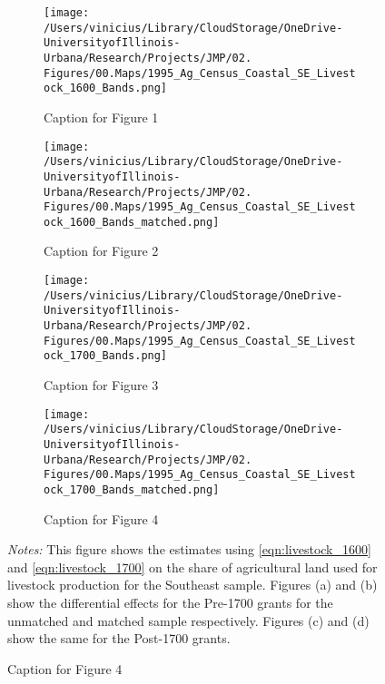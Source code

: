 \documentclass[11pt]{article}
\begin{document}
\clearpage

\begin{landscape}
  \begin{figure}[htbp]
    \caption{Effects of Coastal Ban on Livestock with Varying Cutoffs on Livestock Area - Southeast Sample}
    \centering
    \begin{subfigure}[b]{0.65\textwidth}
        \centering
        \texttt{[image: /Users/vinicius/Library/CloudStorage/OneDrive-UniversityofIllinois-Urbana/Research/Projects/JMP/02. Figures/00.Maps/1995\_Ag\_Census\_Coastal\_SE\_Livestock\_1600\_Bands.png]}
        \caption{Caption for Figure 1}
        \label{fig:fig1}
    \end{subfigure}
    \hfill
    \begin{subfigure}[b]{0.65\textwidth}
        \centering
        \texttt{[image: /Users/vinicius/Library/CloudStorage/OneDrive-UniversityofIllinois-Urbana/Research/Projects/JMP/02. Figures/00.Maps/1995\_Ag\_Census\_Coastal\_SE\_Livestock\_1600\_Bands\_matched.png]}
        \caption{Caption for Figure 2}
        \label{fig:fig2}
    \end{subfigure}

    \vspace{0.1cm} %

    \begin{subfigure}[b]{0.65\textwidth}
        \centering
        \texttt{[image: /Users/vinicius/Library/CloudStorage/OneDrive-UniversityofIllinois-Urbana/Research/Projects/JMP/02. Figures/00.Maps/1995\_Ag\_Census\_Coastal\_SE\_Livestock\_1700\_Bands.png]}
        \caption{Caption for Figure 3}
        \label{fig:fig3}
    \end{subfigure}
    \hfill
    \begin{subfigure}[b]{0.65\textwidth}
        \centering
        \texttt{[image: /Users/vinicius/Library/CloudStorage/OneDrive-UniversityofIllinois-Urbana/Research/Projects/JMP/02. Figures/00.Maps/1995\_Ag\_Census\_Coastal\_SE\_Livestock\_1700\_Bands\_matched.png]}
        \caption{Caption for Figure 4}
        \label{fig:fig4}
    \end{subfigure}

    \vspace{0.5cm}
    \justifying
    \noindent \textit{Notes:} This figure shows the estimates using \autoref{eqn:livestock_1600} and \autoref{eqn:livestock_1700} on the share of agricultural land used for livestock production for the Southeast sample. Figures (a) and (b) show the differential effects for the Pre-1700 grants for the unmatched and matched sample respectively. Figures (c) and (d) show the same for the Post-1700 grants.
    \label{fig:robustness_SE_distance_cutoff}
    
\end{figure}
\end{landscape}
\end{document}
